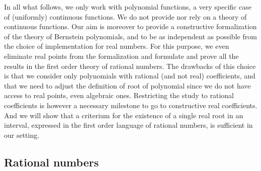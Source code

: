 \documentclass{mscs}
\begin{document}
In all what follows, we only work with polynomial functions, a very
specific case of (uniformly) continuous functions. We do not provide
nor rely on a theory of continuous functions. Our aim is moreover to
provide a constructive formalization of the theory of Bernstein
polynomials, and to be as independent as possible from the choice of
implementation for real numbers. For this purpose, we even eliminate
real points from the
formalization and formulate and prove all the results in the first
order theory of rational numbers. The drawbacks of this choice is that
we consider only polynomials with rational (and not real)
coefficients, and that we need to adjust the definition of root of
polynomial since we do not have access to real points, even algebraic
ones. Restricting the study to rational coefficients is however a
necessary milestone to go to constructive real coefficients. And we
will show that a criterium for the existence of a single real root in
an interval, expressed in the first order language of rational
numbers, is sufficient in our setting.

\subsection{Rational numbers}


\end{document}
